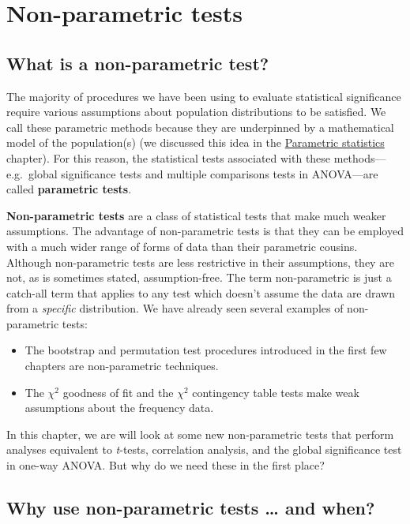 \documentclass[
]{book}
\providecommand{\tightlist}{%
  \setlength{\itemsep}{0pt}\setlength{\parskip}{0pt}}
\begin{document}
\hypertarget{non-parametric-tests}{%
\chapter{Non-parametric tests}\label{non-parametric-tests}}

\hypertarget{what-is-non-par}{%
\section{What is a non-parametric test?}\label{what-is-non-par}}

The majority of procedures we have been using to evaluate statistical significance require various assumptions about population distributions to be satisfied. We call these parametric methods because they are underpinned by a mathematical model of the population(s) (we discussed this idea in the \protect\hyperlink{parametric-statistics}{Parametric statistics} chapter). For this reason, the statistical tests associated with these methods---e.g.~global significance tests and multiple comparisons tests in ANOVA---are called \textbf{parametric tests}.

\textbf{Non-parametric tests} are a class of statistical tests that make much weaker assumptions. The advantage of non-parametric tests is that they can be employed with a much wider range of forms of data than their parametric cousins. Although non-parametric tests are less restrictive in their assumptions, they are not, as is sometimes stated, assumption-free. The term non-parametric is just a catch-all term that applies to any test which doesn't assume the data are drawn from a \emph{specific} distribution. We have already seen several examples of non-parametric tests:

\begin{itemize}
\tightlist
\item
  The bootstrap and permutation test procedures introduced in the first few chapters are non-parametric techniques.
\item
  The \(\chi^{2}\) goodness of fit and the \(\chi^{2}\) contingency table tests make weak assumptions about the frequency data.
\end{itemize}

In this chapter, we are will look at some new non-parametric tests that perform analyses equivalent to \emph{t}-tests, correlation analysis, and the global significance test in one-way ANOVA. But why do we need these in the first place?

\hypertarget{why-when}{%
\section{Why use non-parametric tests \ldots{} and when?}\label{why-when}}
\end{document}
